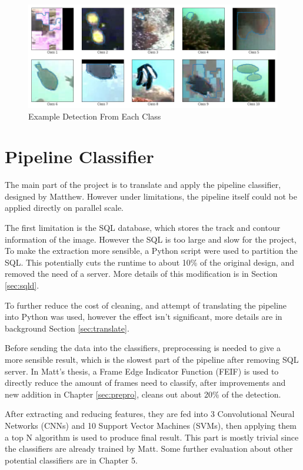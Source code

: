 \documentclass[bsc,logo,twoside,fullspacing,parskip]{infthesis}
\begin{document}
\begin{figure}[!b]
    \centering
    \includegraphics[scale=0.44]{graph/class_sample.png}
    \caption{Example Detection From Each Class}
    \label{fig:classes}
\end{figure}

\section{Pipeline Classifier}

The main part of the project is to translate and apply the pipeline classifier, designed by Matthew. 
However under limitations, the pipeline itself could not be applied directly on parallel scale.

The first limitation is the SQL database, which stores the track and contour information of the image. 
However the SQL is too large and slow for the project, To make the extraction more sensible, a Python script were used to partition the SQL.
This potentially cuts the runtime to about 10\% of the original design, and removed the need of a server. 
More details of this modification is in Section \ref{sec:sqld}.

To further reduce the cost of cleaning, and attempt of translating the pipeline into Python was used, however the effect isn't significant, more details are in background Section \ref{sec:translate}.

Before sending the data into the classifiers, preprocessing is needed to give a more sensible result, which is the slowest part of the pipeline after removing SQL server. 
In Matt's thesis, a Frame Edge Indicator Function (FEIF) is used to directly reduce the amount of frames need to classify, after improvements and new addition in Chapter \ref{sec:prepro}, cleans out about 20\% of the detection.

After extracting and reducing features, they are fed into 3 Convolutional Neural Networks (CNNs) and 10 Support Vector Machines (SVMs), then applying them a top N algorithm is used to produce final result. 
This part is mostly trivial since the classifiers are already trained by Matt. Some further evaluation about other potential classifiers are in Chapter 5.
\end{document}
